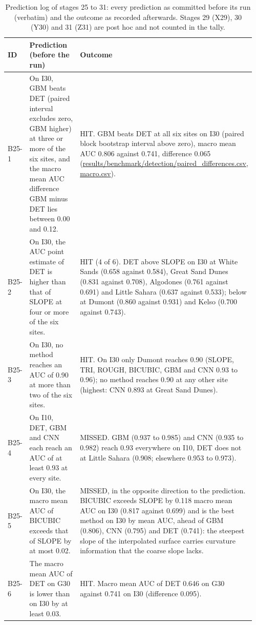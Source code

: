 \documentclass[10pt]{article}
\begin{document}
\begin{longtable}{@{}p{0.08\linewidth}p{0.42\linewidth}p{0.46\linewidth}@{}}
\caption{Prediction log of stages 25 to 31: every prediction as committed before its run (verbatim) and the outcome as recorded afterwards. Stages 29 (X29), 30 (Y30) and 31 (Z31) are post hoc and not counted in the tally.}\label{tab:log}\\
\toprule
ID & Prediction (before the run) & Outcome \\
\midrule
\endhead
B25-1 & On I30, GBM beats DET (paired interval excludes zero, GBM higher) at three or more of the six sites, and the macro mean AUC difference GBM minus DET lies between 0.00 and 0.12. & HIT. GBM beats DET at all six sites on I30 (paired block bootstrap interval above zero), macro mean AUC 0.806 against 0.741, difference 0.065 (\url{results/benchmark/detection/paired_differences.csv}, \url{macro.csv}). \\
B25-2 & On I30, the AUC point estimate of DET is higher than that of SLOPE at four or more of the six sites. & HIT (4 of 6). DET above SLOPE on I30 at White Sands (0.658 against 0.584), Great Sand Dunes (0.831 against 0.708), Algodones (0.761 against 0.691) and Little Sahara (0.637 against 0.533); below at Dumont (0.860 against 0.931) and Kelso (0.700 against 0.743). \\
B25-3 & On I30, no method reaches an AUC of 0.90 at more than two of the six sites. & HIT. On I30 only Dumont reaches 0.90 (SLOPE, TRI, ROUGH, BICUBIC, GBM and CNN 0.93 to 0.96); no method reaches 0.90 at any other site (highest: CNN 0.893 at Great Sand Dunes). \\
B25-4 & On I10, DET, GBM and CNN each reach an AUC of at least 0.93 at every site. & MISSED. GBM (0.937 to 0.985) and CNN (0.935 to 0.982) reach 0.93 everywhere on I10, DET does not at Little Sahara (0.908; elsewhere 0.953 to 0.973). \\
B25-5 & On I30, the macro mean AUC of BICUBIC exceeds that of SLOPE by at most 0.02. & MISSED, in the opposite direction to the prediction. BICUBIC exceeds SLOPE by 0.118 macro mean AUC on I30 (0.817 against 0.699) and is the best method on I30 by mean AUC, ahead of GBM (0.806), CNN (0.795) and DET (0.741): the steepest slope of the interpolated surface carries curvature information that the coarse slope lacks. \\
B25-6 & The macro mean AUC of DET on G30 is lower than on I30 by at least 0.03. & HIT. Macro mean AUC of DET 0.646 on G30 against 0.741 on I30 (difference 0.095). \\

\end{longtable}
\end{document}
